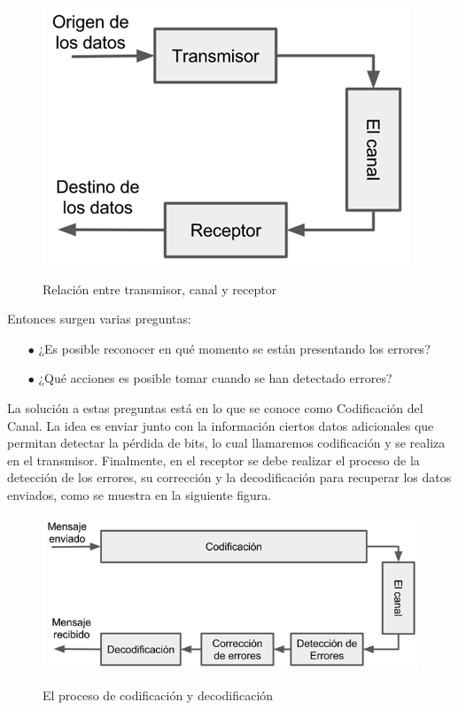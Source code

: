 \begin{figure}[h!]
	\captionsetup{justification = raggedright, singlelinecheck = false}
	\caption{Relación entre transmisor, canal y receptor} 
	\centering
	\includegraphics[scale=1]{Imagenes/Relacion-canal.png}
	\label{fig:Relacion-canal}
\end{figure}

Entonces surgen varias preguntas:
\begin{itemize}
	\item [$\bullet$] ¿Es posible reconocer en qué momento se están presentando los errores?
	\item [$\bullet$] ¿Qué acciones es posible tomar cuando se han detectado errores?
\end{itemize}

La solución a estas preguntas está en lo que se conoce como Codificación del Canal. La idea es enviar junto con la información ciertos datos adicionales que permitan detectar la pérdida de bits, lo cual llamaremos codificación y se realiza en el transmisor. Finalmente, en el receptor se debe realizar el proceso de la detección de los errores, su corrección y la decodificación para recuperar los datos enviados, como se muestra en la siguiente figura.\\

\vspace{200px}
\begin{figure}[h!]
	\captionsetup{justification = raggedright, singlelinecheck = false}
	\caption{El proceso de codificación y decodificación } 
	\centering
	\includegraphics[scale=1]{Imagenes/Codificacion.png}
	\label{fig:Codificacion}
\end{figure}


